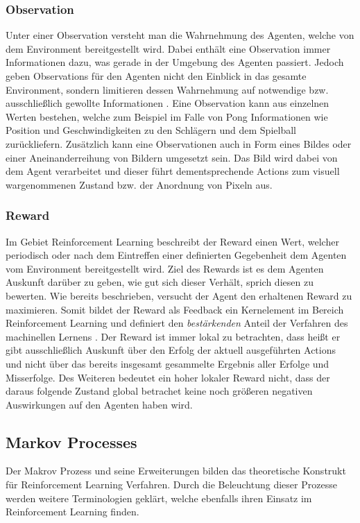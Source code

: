 \documentclass[11pt]{scrartcl}
\begin{document}
\subsubsection{Observation}
Unter einer Observation versteht man die Wahrnehmung des Agenten, welche von dem Environment 
bereitgestellt wird. Dabei enthält eine Observation immer Informationen dazu, was gerade in der
Umgebung des Agenten passiert. Jedoch geben Observations für den Agenten nicht den Einblick
in das gesamte Environment, sondern limitieren dessen Wahrnehmung auf notwendige bzw. ausschließlich
gewollte Informationen \cite[~S.8 f.]{L2018}. Eine Observation kann aus einzelnen Werten bestehen, 
welche zum Beispiel im Falle von Pong Informationen wie Position und Geschwindigkeiten zu den
Schlägern und dem Spielball zurückliefern. Zusätzlich kann eine Observationen auch in Form eines 
Bildes oder einer Aneinanderreihung von Bildern umgesetzt sein. Das Bild wird dabei von 
dem Agent verarbeitet und dieser führt dementsprechende Actions zum visuell wargenommenen Zustand
bzw. der Anordnung von Pixeln aus. 


\subsubsection{Reward}
Im Gebiet Reinforcement Learning beschreibt der Reward einen Wert, welcher periodisch oder nach
dem Eintreffen einer definierten Gegebenheit dem Agenten vom Environment bereitgestellt wird.
Ziel des Rewards ist es dem Agenten Auskunft darüber zu geben, wie gut sich dieser Verhält, sprich
diesen zu bewerten. Wie bereits beschrieben, versucht der Agent den erhaltenen Reward zu
maximieren. Somit bildet der Reward als Feedback ein Kernelement im Bereich Reinforcement
Learning und definiert den \textit{bestärkenden} Anteil der Verfahren des machinellen Lernens 
\cite[~S.6 f.]{L2018}. Der Reward ist immer lokal zu betrachten, dass heißt er gibt ausschließlich 
Auskunft über den Erfolg der aktuell ausgeführten Actions und nicht über das bereits insgesamt
gesammelte Ergebnis aller Erfolge und Misserfolge. Des Weiteren bedeutet ein hoher lokaler Reward 
nicht, dass der daraus folgende Zustand global betrachet keine noch größeren negativen Auswirkungen 
auf den Agenten haben wird.

\subsection{Markov Processes}
Der Makrov Prozess und seine Erweiterungen bilden das theoretische Konstrukt für Reinforcement Learning
Verfahren. Durch die Beleuchtung dieser Prozesse werden weitere Terminologien geklärt, welche ebenfalls
ihren Einsatz im Reinforcement Learning finden.
\end{document}
